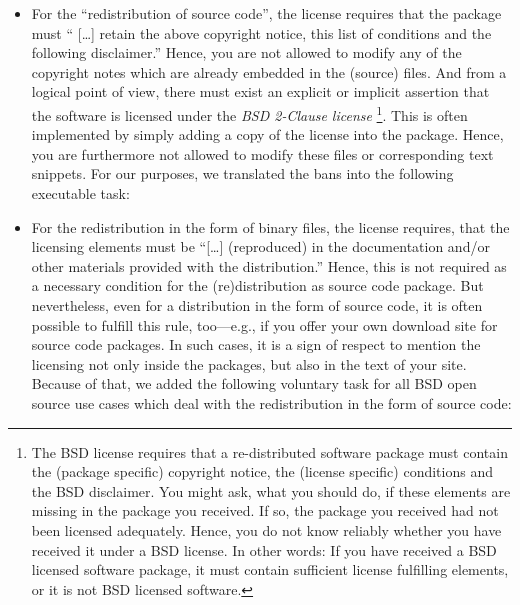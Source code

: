 \begin{itemize}
\item For the \enquote{redistribution of source code}, the license requires
  that the package must \enquote{ [\ldots] retain the above copyright notice,
  this list of conditions and the following disclaimer.}\citeBSDsimple{}
  Hence, you are not allowed to modify any of the copyright notes which are
  already embedded in the (source) files. And from a logical point of view,
  there must exist an explicit or implicit assertion that the software is
  licensed under the \textit{BSD 2-Clause license}%
  \footnote{The BSD license requires that a re-distributed software package must 
    contain the (package specific) copyright notice, the (license specific)
    conditions and the BSD disclaimer.\cite[cf.][\nopage wp]{BsdLicense2Clause} 
    You might ask, what you should do, if these elements are missing in the
    package you received. If so, the package you received had not been licensed
    adequately. Hence, you do not know reliably whether you have received it
    under a BSD license. In other words: If you have received a BSD licensed
    software package, it must contain sufficient license fulfilling elements, or
    it is not BSD licensed software.}. 
  This is often implemented by simply adding a copy of the license into the
  package. Hence, you are furthermore not allowed to modify these files or
  corresponding text snippets. For our purposes, we translated the bans into the
  following executable task: 

\begin{quote}\textit{\keepLicenseElements}\end{quote}

\item For the redistribution in the form of binary files, the license requires,
  that the licensing elements must be \enquote{[\ldots] (reproduced) in the
  documentation and/or other materials provided with the distribution.}%
  \citeBSDsimple{}
  Hence, this is not required as a necessary condition for the (re)distribution
  as source code package. But nevertheless, even for a distribution in the form
  of source code, it is often possible to fulfill this rule, too---e.g., if you
  offer your own download site for source code packages.  In such cases, it is a
  sign of respect to mention the licensing not only inside the packages, but
  also in the text of your site. Because of that, we added the following
  voluntary task for all BSD open source use cases which deal with the
  redistribution in the form of source code: 


\end{itemize}
